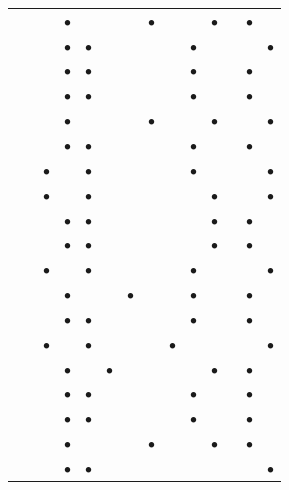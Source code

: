 \documentclass[11pt,3p]{elsarticle}
\begin{document}
\begin{table}[!htbp]
{\begin{tabular}{lccccccccccccc}
\citet{bersani2009network} &  &  & $\bullet$ &  &  &  & $\bullet$ &  &  & $\bullet$ &  & $\bullet$ &  \\
\citet{bique2018balancing} &  &  & $\bullet$ & $\bullet$ &  &  &  &  & $\bullet$ &  &  &  & $\bullet$ \\
\citet{bique2018outlook} &  &  & $\bullet$ & $\bullet$ &  &  &  &  & $\bullet$ &  &  & $\bullet$ &  \\
\citet{brey2006designing} &  &  & $\bullet$ & $\bullet$ &  &  &  &  & $\bullet$ &  &  & $\bullet$ &  \\
\citet{brey2012using} &  &  & $\bullet$ &  &  &  & $\bullet$ &  &  & $\bullet$ &  &  & $\bullet$ \\
\citet{cho2016optimization} &  &  & $\bullet$ & $\bullet$ &  &  &  &  & $\bullet$ &  &  & $\bullet$ &  \\
\citet{contaldi2008hydrogen} &  & $\bullet$ &  & $\bullet$ &  &  &  &  & $\bullet$ &  &  &  & $\bullet$ \\
\citet{contreras2009market} &  & $\bullet$ &  & $\bullet$ &  &  &  &  &  & $\bullet$ &  &  & $\bullet$ \\
\citet{dagdougui2012modelling} &  &  & $\bullet$ & $\bullet$ &  &  &  &  &  & $\bullet$ &  & $\bullet$ &  \\
\citet{dayhim2014planning} &  &  & $\bullet$ & $\bullet$ &  &  &  &  &  & $\bullet$ &  & $\bullet$ &  \\
\citet{endo2007market} &  & $\bullet$ &  & $\bullet$ &  &  &  &  & $\bullet$ &  &  &  & $\bullet$ \\
\citet{gim2012transportation} &  &  & $\bullet$ &  &  & $\bullet$ &  &  & $\bullet$ &  &  & $\bullet$ &  \\
\citet{guillen2010bi} &  &  & $\bullet$ & $\bullet$ &  &  &  &  & $\bullet$ &  &  & $\bullet$ &  \\
\citet{gul2009energy} &  & $\bullet$ &  & $\bullet$ &  &  &  & $\bullet$ &  &  &  &  & $\bullet$ \\
\citet{hajimiragha2009hydrogen} &  &  & $\bullet$ &  & $\bullet$ &  &  &  &  & $\bullet$ &  & $\bullet$ &  \\
\citet{han2012modeling} &  &  & $\bullet$ & $\bullet$ &  &  &  &  & $\bullet$ &  &  & $\bullet$ &  \\
\citet{han2013multi} &  &  & $\bullet$ & $\bullet$ &  &  &  &  & $\bullet$ &  &  & $\bullet$ &  \\
\citet{he2017hydrogen} &  &  & $\bullet$ &  &  &  & $\bullet$ &  &  & $\bullet$ &  & $\bullet$ &  \\
\citet{hugo2005hydrogen} &  &  & $\bullet$ & $\bullet$ &  &  &  &  &  &  &  &  & $\bullet$ \\

\end{tabular}}
\end{table}
\end{document}
